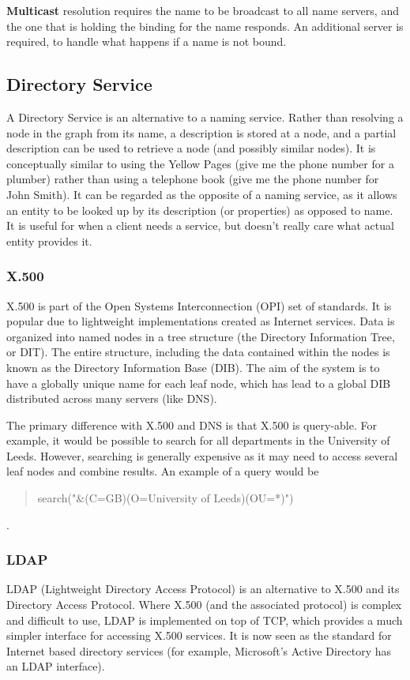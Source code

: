 \documentclass{article}
\begin{document}
\textbf{Multicast} resolution requires the name to be broadcast to all name servers, and the one that is holding the binding for the name responds. An additional server is required, to handle what happens if a name is not bound. 

\subsection{Directory Service}
A Directory Service is an alternative to a naming service. Rather than resolving a node in the graph from its name, a description is stored at a node, and a partial description can be used to retrieve a node (and possibly similar nodes). It is conceptually similar to using the Yellow Pages (give me the phone number for a plumber) rather than using a telephone book (give me the phone number for John Smith). It can be regarded as the opposite of a naming service, as it allows an entity to be looked up by its description (or properties) as opposed to name. It is useful for when a client needs a service, but doesn't really care what actual entity provides it.

\subsubsection{X.500}
X.500 is part of the Open Systems Interconnection (OPI) set of standards. It is popular due to lightweight implementations created as Internet services. Data is organized into named nodes in a tree structure (the Directory Information Tree, or DIT). The entire structure, including the data contained within the nodes is known as the Directory Information Base (DIB). The aim of the system is to have a globally unique name for each leaf node, which has lead to a global DIB distributed across many servers (like DNS). 

The primary difference with X.500 and DNS is that X.500 is query-able. For example, it would be possible to search for all departments in the University of Leeds. However, searching is generally expensive as it may need to access several leaf nodes and combine results. An example of a query would be \begin{quote}search("\&(C=GB)(O=University of Leeds)(OU=*)")\end{quote}.

\subsubsection{LDAP}
LDAP (Lightweight Directory Access Protocol) is an alternative to X.500 and its Directory Access Protocol. Where X.500 (and the associated protocol) is complex and difficult to use, LDAP is implemented on top of TCP, which provides a much simpler interface for accessing X.500 services. It is now seen as the standard for Internet based directory services (for example, Microsoft's Active Directory has an LDAP interface). 
\end{document}
